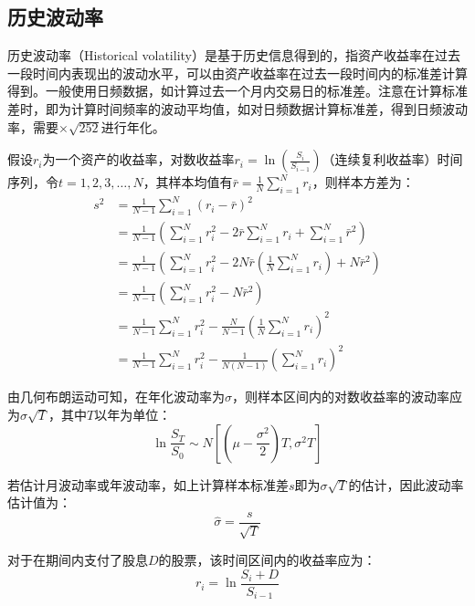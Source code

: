 \documentclass[11pt]{article}
\begin{document}
\subsection{历史波动率}

历史波动率（Historical volatility）是基于历史信息得到的，指资产收益率在过去一段时间内表现出的波动水平，可以由资产收益率在过去一段时间内的标准差计算得到。一般使用日频数据，如计算过去一个月内交易日的标准差。注意在计算标准差时，即为计算时间频率的波动平均值，如对日频数据计算标准差，得到日频波动率，需要$\times \sqrt{252}$进行年化。

假设$r_i$为一个资产的收益率，对数收益率$r_i = \ln \left( \frac{S_i}{S_{i-1}} \right)$（连续复利收益率）时间序列，令$t=1,2,3,\dots,N$，其样本均值有$\bar{r} = \frac{1}{N} \sum_{i=1}^{N}r_i$，则样本方差为：
\begin{align*}
    s^2 &= \frac{1}{N-1} \sum^N_{i=1} (r_i - \bar{r})^2 \\
    &= \frac{1}{N-1} \left( \sum^N_{i=1} r_i^2 - 2\bar{r} \sum^N_{i=1} r_i + \sum^N_{i=1} \bar{r}^2 \right) \\
    &= \frac{1}{N-1} \left( \sum^N_{i=1} r_i^2 - 2N\bar{r}\left(\frac{1}{N} \sum^N_{i=1} r_i \right) + N \bar{r}^2 \right) \\
    &= \frac{1}{N-1} \left( \sum^N_{i=1} r_i^2 - N \bar{r}^2 \right) \\
    &= \frac{1}{N-1} \sum^N_{i=1} r_i^2 - \frac{N}{N-1} \left( \frac{1}{N}  \sum^N_{i=1} r_i \right)^2 \\
    &= \frac{1}{N-1} \sum^N_{i=1} r_i^2 - \frac{1}{N(N-1)} \left( \sum^N_{i=1} r_i \right)^2
\end{align*}

由几何布朗运动可知，在年化波动率为$\sigma$，则样本区间内的对数收益率的波动率应为$\sigma \sqrt{T}$，其中$T$以年为单位：
\begin{equation*}
    \ln \frac{S_T}{S_0} \sim N\left[ \left(\mu-\frac{\sigma^2}{2}\right)T ,\sigma^2 T \right]
\end{equation*}

若估计月波动率或年波动率，如上计算样本标准差$s$即为$\sigma \sqrt{T}$的估计，因此波动率估计值为：
\begin{equation*}
    \hat{\sigma} = \frac{s}{\sqrt{T}}
\end{equation*}

对于在期间内支付了股息$D$的股票，该时间区间内的收益率应为：
\begin{equation*}
    r_i = \ln \frac{S_i + D}{S_{i-1}}
\end{equation*}
\end{document}
